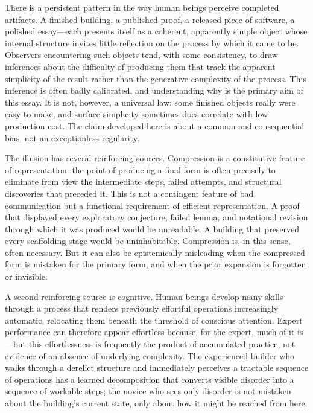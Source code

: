 \documentclass[12pt, a4paper]{article}
\theoremstyle{plain}
\theoremstyle{definition}
\theoremstyle{remark}
\begin{document}
There is a persistent pattern in the way human beings perceive completed artifacts. A finished building, a published proof, a released piece of software, a polished essay---each presents itself as a coherent, apparently simple object whose internal structure invites little reflection on the process by which it came to be. Observers encountering such objects tend, with some consistency, to draw inferences about the difficulty of producing them that track the apparent simplicity of the result rather than the generative complexity of the process. This inference is often badly calibrated, and understanding why is the primary aim of this essay. It is not, however, a universal law: some finished objects really were easy to make, and surface simplicity sometimes does correlate with low production cost. The claim developed here is about a common and consequential bias, not an exceptionless regularity.

The illusion has several reinforcing sources. Compression is a constitutive feature of representation: the point of producing a final form is often precisely to eliminate from view the intermediate steps, failed attempts, and structural discoveries that preceded it. This is not a contingent feature of bad communication but a functional requirement of efficient representation. A proof that displayed every exploratory conjecture, failed lemma, and notational revision through which it was produced would be unreadable. A building that preserved every scaffolding stage would be uninhabitable. Compression is, in this sense, often necessary. But it can also be epistemically misleading when the compressed form is mistaken for the primary form, and when the prior expansion is forgotten or invisible.

A second reinforcing source is cognitive. Human beings develop many skills through a process that renders previously effortful operations increasingly automatic, relocating them beneath the threshold of conscious attention. Expert performance can therefore appear effortless because, for the expert, much of it is---but this effortlessness is frequently the product of accumulated practice, not evidence of an absence of underlying complexity. The experienced builder who walks through a derelict structure and immediately perceives a tractable sequence of operations has a learned decomposition that converts visible disorder into a sequence of workable steps; the novice who sees only disorder is not mistaken about the building's current state, only about how it might be reached from here.
\end{document}
